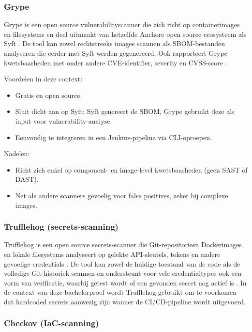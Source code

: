 \subsubsection{Grype}

Grype is een open source vulnerabilityscanner die zich richt op containerimages en filesystems en deel uitmaakt van hetzelfde Anchore open source ecosysteem als Syft \autocite{AnchoreOpensource}.
De tool kan zowel rechtstreeks images scannen als SBOM-bestanden analyseren die eerder met Syft werden gegenereerd. Ook rapporteert Grype kwetsbaarheden met onder andere CVE-identifier, severity en CVSS-score \autocite{GrypeGithub,BionSyftGrype}.

Voordelen in deze context:
\begin{itemize}
  \item Gratis en open source.
  \item Sluit dicht aan op Syft: Syft genereert de SBOM, Grype gebruikt deze als input voor vulnerability-analyse.
  \item Eenvoudig te integreren in een Jenkins-pipeline via CLI-oproepen.
\end{itemize}

Nadelen:
\begin{itemize}
  \item Richt zich enkel op component- en image-level kwetsbaarheden (geen SAST of DAST).
  \item Net als andere scanners gevoelig voor false positives, zeker bij complexe images.
\end{itemize}

\subsubsection{Trufflehog (secrets-scanning)}

Trufflehog is een open source secrets-scanner die Git-repositoriesn Dockerimages en lokale filesystems analyseert op gelekte API-sleutels, tokens en andere gevoelige credentials \autocite{TrufflehogGithub,TrufflehogBlogGitVsFs}. De tool kan zowel de huidige toestand van de code als de volledige Git-historiek scannen en ondersteunt voor vele credentialtypes ook een vorm van verificatie, waarbij getest wordt of een gevonden secret nog actief is \autocite{TrufflehogDeepDive}. In de context van deze bachelorproef wordt Trufflehog gebruikt om te voorkomen dat hardcoded secrets aanwezig zijn wanner de CI/CD-pipeline wordt uitgevoerd.

\subsubsection{Checkov (IaC-scanning)}

